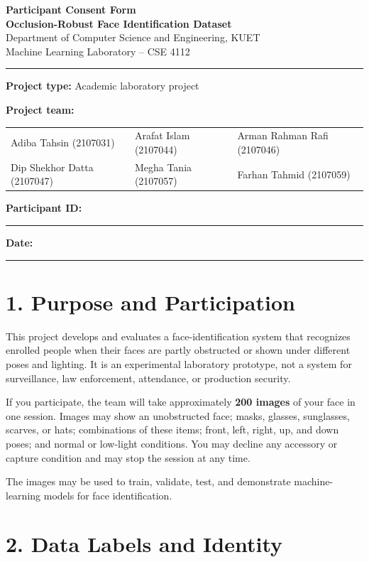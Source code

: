 \documentclass[11pt,a4paper]{article}
\newcommand{\blank}[1]{\rule{#1}{0.4pt}}
\begin{document}
\begin{center}
    {\Large\textbf{Participant Consent Form}}\\[2pt]
    {\large\textbf{Occlusion-Robust Face Identification Dataset}}\\[4pt]
    Department of Computer Science and Engineering, KUET\\
    Machine Learning Laboratory -- CSE 4112
\end{center}

\hrule
\vspace{5pt}

\textbf{Project type:} Academic laboratory project

\textbf{Project team:}\par\vspace{-2pt}
{\footnotesize
\begin{tabularx}{\textwidth}{@{}X X X@{}}
    Adiba Tahsin (2107031) & Arafat Islam (2107044) & Arman Rahman Rafi (2107046) \\
    Dip Shekhor Datta (2107047) & Megha Tania (2107057) & Farhan Tahmid (2107059)
\end{tabularx}}
\vspace{-2pt}

\textbf{Participant ID:} \blank{3cm} \hfill
\textbf{Date:} \blank{3cm}

\section*{1. Purpose and Participation}

This project develops and evaluates a face-identification system that recognizes enrolled people when their faces are partly obstructed or shown under different poses and lighting. It is an experimental laboratory prototype, not a system for surveillance, law enforcement, attendance, or production security.

If you participate, the team will take approximately \textbf{200 images} of your face in one session. Images may show an unobstructed face; masks, glasses, sunglasses, scarves, or hats; combinations of these items; front, left, right, up, and down poses; and normal or low-light conditions. You may decline any accessory or capture condition and may stop the session at any time.

The images may be used to train, validate, test, and demonstrate machine-learning models for face identification.

\section*{2. Data Labels and Identity}
\end{document}
